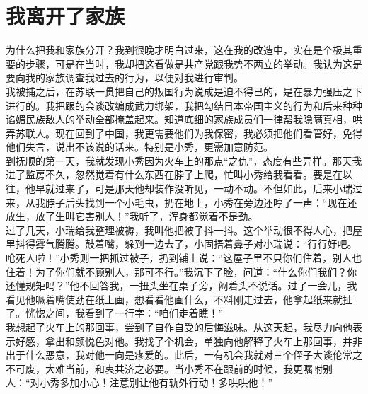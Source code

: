 \fancyhead[RO]{\thepage} %
\fancyhead[LE]{\thepage} %
\chapter*{我离开了家族}
为什么把我和家族分开？我到很晚才明白过来，这在我的改造中，实在是个极其重要的步骤，可是在当时，我却把这看做是共产党跟我势不两立的举动。我认为这是要向我的家族调查我过去的行为，以便对我进行审判。\\

我被捕之后，在苏联一贯把自己的叛国行为说成是迫不得已的，是在暴力强压之下进行的。我把跟的会谈改编成武力绑架，我把勾结日本帝国主义的行为和后来种种谄媚民族敌人的举动全部掩盖起来。知道底细的家族成员们一律帮我隐瞒真相，哄弄苏联人。现在回到了中国，我更需要他们为我保密，我必须把他们看管好，免得他们失言，说出不该说的话来。特别是小秀，更需加意防范。\\

到抚顺的第一天，我就发现小秀因为火车上的那点“之仇”，态度有些异样。那天我进了监房不久，忽然觉着有什么东西在脖子上爬，忙叫小秀给我看看。要是在以往，他早就过来了，可是那天他却装作没听见，一动不动。不但如此，后来小瑞过来，从我脖子后头找到一个小毛虫，扔在地上，小秀在旁边还哼了一声：“现在还放生，放了生叫它害别人！”我听了，浑身都觉着不是劲。\\

过了几天，小瑞给我整理被褥，我叫他把被子抖一抖。这个举动很不得人心，把屋里抖得雾气腾腾。鼓着嘴，躲到一边去了，小固捂着鼻子对小瑞说：“行行好吧。呛死人啦！”小秀则一把抓过被子，扔到铺上说：“这屋子里不只你们住着，别人也住着！为了你们就不顾别人，那可不行。”我沉下了脸，问道：“什么你们我们？你还懂规矩吗？”他不回答我，一扭头坐在桌子旁，闷着头不说话。过了一会儿，我看见他噘着嘴使劲在纸上画，想看看他画什么，不料刚走过去，他拿起纸来就扯了。恍惚之间，我看到了一行字：“咱们走着瞧！”\\

我想起了火车上的那回事，尝到了自作自受的后悔滋味。从这天起，我尽力向他表示好感，拿出和颜悦色对他。我找了个机会，单独向他解释了火车上那回事，并非出于什么恶意，我对他一向是疼爱的。此后，一有机会我就对三个侄子大谈伦常之不可废，大难当前，和衷共济之必要。当小秀不在跟前的时候，我更嘱咐别人：“对小秀多加小心！注意别让他有轨外行动！多哄哄他！”\\

